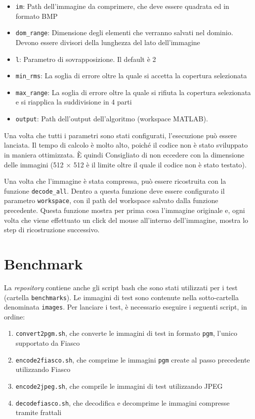 \documentclass[11pt,a4paper,appendixprefix=true,numbers=noenddot]{scrreprt}
\begin{document}
\begin{itemize}
\item \texttt{im}: Path dell'immagine da comprimere, che deve essere quadrata ed in formato BMP
\item \texttt{dom\_range}: Dimensione degli elementi che verranno salvati nel dominio. Devono essere divisori della lunghezza del lato dell'immagine
\item \texttt{l}: Parametro di sovrapposizione. Il default è 2
\item \texttt{min\_rms}: La soglia di errore oltre la quale si accetta la copertura selezionata
\item \texttt{max\_range}: La soglia di errore oltre la quale si rifiuta la copertura selezionata e si riapplica la suddivisione in 4 parti 
\item \texttt{output}: Path dell'output dell'algoritmo (workspace MATLAB).
\end{itemize}

Una volta che tutti i parametri sono stati configurati, l'esecuzione può essere lanciata. Il tempo di calcolo è molto alto, poiché il codice non è stato sviluppato in maniera ottimizzata. È quindi Consigliato di non eccedere con la dimensione delle immagini (512 $\times$ 512 è il limite oltre il quale il codice non è stato testato).

Una volta che l'immagine è stata compressa, può essere ricostruita con la funzione \texttt{decode\_all}. Dentro a questa funzione deve essere configurato il parametro \texttt{workspace}, con il path del workspace salvato dalla funzione precedente. Questa funzione mostra per prima cosa l'immagine originale e, ogni volta che viene effettuato un click del mouse all'interno dell'immagine, mostra lo step di ricostruzione successivo.

\section{Benchmark}

La \emph{repository} contiene anche gli script bash che sono stati utilizzati per i test (cartella \texttt{benchmarks}). Le immagini di test sono contenute nella sotto-cartella denominata \texttt{images}. Per lanciare i test, è necessario eseguire i seguenti script, in ordine:

\begin{enumerate}
\item \texttt{convert2pgm.sh}, che converte le immagini di test in formato \texttt{pgm}, l'unico supportato da Fiasco
\item \texttt{encode2fiasco.sh}, che comprime le immagini \texttt{pgm} create al passo precedente utilizzando Fiasco
\item \texttt{encode2jpeg.sh}, che comprile le immagini di test utilizzando JPEG
\item \texttt{decodefiasco.sh}, che decodifica e decomprime le immagini compresse tramite frattali
\end{enumerate}
\end{document}

